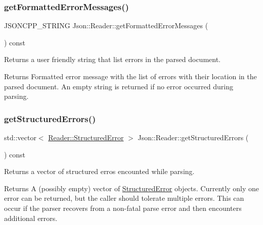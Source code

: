 \subsubsection{\texorpdfstring{get\+Formatted\+Error\+Messages()}{getFormattedErrorMessages()}}
{\footnotesize\ttfamily J\+S\+O\+N\+C\+P\+P\+\_\+\+S\+T\+R\+I\+NG Json\+::\+Reader\+::get\+Formatted\+Error\+Messages (\begin{DoxyParamCaption}{ }\end{DoxyParamCaption}) const}



Returns a user friendly string that list errors in the parsed document. 

\begin{DoxyReturn}{Returns}
Formatted error message with the list of errors with their location in the parsed document. An empty string is returned if no error occurred during parsing. 
\end{DoxyReturn}
\mbox{\label{classJson_1_1Reader_ae3d714e95bd98b27e296c607e408189b}} 
\subsubsection{\texorpdfstring{get\+Structured\+Errors()}{getStructuredErrors()}}
{\footnotesize\ttfamily std\+::vector$<$ \hyperlink{structJson_1_1Reader_1_1StructuredError}{Reader\+::\+Structured\+Error} $>$ Json\+::\+Reader\+::get\+Structured\+Errors (\begin{DoxyParamCaption}{ }\end{DoxyParamCaption}) const}



Returns a vector of structured erros encounted while parsing. 

\begin{DoxyReturn}{Returns}
A (possibly empty) vector of \hyperlink{structJson_1_1Reader_1_1StructuredError}{Structured\+Error} objects. Currently only one error can be returned, but the caller should tolerate multiple errors. This can occur if the parser recovers from a non-\/fatal parse error and then encounters additional errors. 
\end{DoxyReturn}
\mbox{\label{classJson_1_1Reader_a86cbb42b3e6d4a4d6416473b1a8f6ae7}} 
